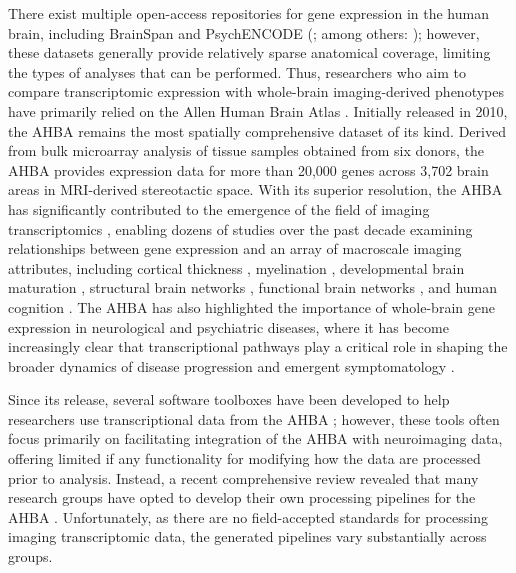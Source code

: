 \documentclass[12pt,aps,pra,reprint,showkeys]{revtex4-1}
\begin{document}
There exist multiple open-access repositories for gene expression in the human brain, including BrainSpan \citep{miller2014nature, kang2011nature} and PsychENCODE (\citealt{gandal2018science, li2018science, wang2018science}; among others: \citealt{sousa2017science, darmanis2015pnas, lake2016science}); however, these datasets generally provide relatively sparse anatomical coverage, limiting the types of analyses that can be performed.
Thus, researchers who aim to compare transcriptomic expression with whole-brain imaging-derived phenotypes have primarily relied on the Allen Human Brain Atlas \citep[AHBA;][]{hawrylycz2012nature, hawrylycz2015natneuro}.
Initially released in 2010, the AHBA remains the most spatially comprehensive dataset of its kind.
Derived from bulk microarray analysis of tissue samples obtained from six donors, the AHBA provides expression data for more than 20,000 genes across 3,702 brain areas in MRI-derived stereotactic space.
With its superior resolution, the AHBA has significantly contributed to the emergence of the field of imaging transcriptomics \citep{fornito2019tics}, enabling dozens of studies over the past decade examining relationships between gene expression and an array of macroscale imaging attributes, including cortical thickness \citep{shin2018cercor}, myelination \citep{burt2018natneuro}, developmental brain maturation \citep{whitakervertes2016pnas, kirsch2016ploscompbio}, structural brain networks \citep{seidlitz2018neuron, romerogarcia2018neuroimage, arnatkevivciute2020genetic}, functional brain networks \citep{richiardi2015science, krienen2016pnas, vertes2016philtrans}, and human cognition \citep{fox2014biorxiv, hansen2021nathumbeh}.
The AHBA has also highlighted the importance of whole-brain gene expression in neurological and psychiatric diseases, where it has become increasingly clear that transcriptional pathways play a critical role in shaping the broader dynamics of disease progression and emergent symptomatology \citep{zheng2019plosbio, shafieibazinet2021biorxiv, henderson2019natneuro, vogel2020natcomm, rittman2016nbaging, anderson2020natcomm, romme2017biolpsych, mccolgan2018biolpsych, morgan2019pnas}.

Since its release, several software toolboxes have been developed to help researchers use transcriptional data from the AHBA \citep{french2015frontneurosci, gorgolewski2015frontneuroinf, rittman2017maybrain, rizzo2016plosone}; however, these tools often focus primarily on facilitating integration of the AHBA with neuroimaging data, offering limited if any functionality for modifying how the data are processed prior to analysis.
Instead, a recent comprehensive review revealed that many research groups have opted to develop their own processing pipelines for the AHBA \citep{arnatkeviciute2019neuroimage}.
Unfortunately, as there are no field-accepted standards for processing imaging transcriptomic data, the generated pipelines vary substantially across groups.
\end{document}
